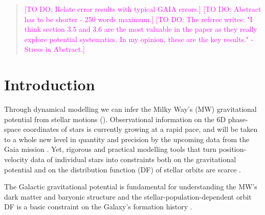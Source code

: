 \documentclass[iop,revtex4]{emulateapj}
\newcommand{\Wilma}[1]{\textcolor{Magenta}{#1}}
\begin{document}
\begin{abstract}
\Wilma{[TO DO: Relate error results with typical GAIA errors.]}
\Wilma{[TO DO: Abstract has to be shorter - 250 words maximum.]} 
\Wilma{[TO DO: The referee writes: "I think section 3.5 and 3.6 are the most valuable in the paper as they really explore potential systematics. In my opinion, these are the key results." - Stress in Abstract.]}
\end{abstract}


\section{Introduction} \label{sec:intro}

Through dynamical modelling we can infer the Milky Way's (MW) gravitational potential from stellar motions (\citealt{2008gady.book.....B,2011Prama..77...39B,2013A&ARv..21...61R}). Observational information on the 6D phase-space coordinates of stars is currently growing at a rapid pace, and will be taken to a whole new level in quantity and precision by the upcoming data from the Gaia mission \citep{2001A&A...369..339P}. Yet, rigorous and practical modelling tools that turn position-velocity data of individual stars into constraints both on the gravitational potential and on the distribution function (DF) of stellar orbits are scarce \citep{2013A&ARv..21...61R}.

The Galactic gravitational potential is fundamental for understanding the MW's dark matter and baryonic structure \citep{2012EPJWC..1910002M,2013A&ARv..21...61R,2013PhR...531....1S,2014JPhG...41f3101R} and the stellar-population-dependent orbit DF is a basic constraint on the Galaxy's formation history \citep{2013NewAR..57...29B,2015MNRAS.449.3479S}.
\end{document}
